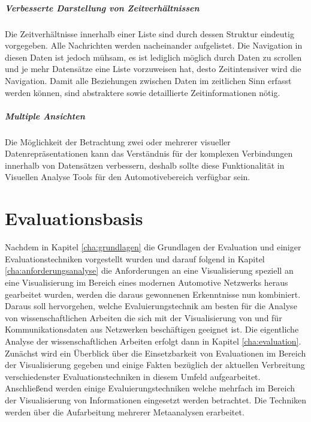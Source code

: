 \documentclass[draft=false
              ,paper=a4
              ,twoside=false
              ,fontsize=11pt
              ,headsepline
              ,BCOR10mm
              ,DIV11
              ]{scrbook}
\begin{document}
\paragraph{Verbesserte Darstellung von Zeitverhältnissen} %
\label{par:verbesserte_darstellung_von_zeitverhältnissen}
Die Zeitverhältnisse innerhalb einer Liste sind durch dessen Struktur eindeutig vorgegeben. Alle Nachrichten werden nacheinander aufgelistet. Die Navigation in diesen Daten ist jedoch mühsam, es ist lediglich möglich durch Daten zu scrollen und je mehr Datensätze eine Liste vorzuweisen hat, desto Zeitintensiver wird die Navigation. Damit alle Beziehungen zwischen Daten im zeitlichen Sinn erfasst werden können, sind abstraktere sowie detaillierte Zeitinformationen nötig.
\paragraph{Multiple Ansichten} %
\label{par:multiple_ansichten}
Die Möglichkeit der Betrachtung zwei oder mehrerer visueller Datenrepräsentationen kann das Verständnis für der komplexen Verbindungen innerhalb von Datensätzen verbessern, deshalb sollte diese Funktionalität in Visuellen Analyse Tools für den Automotivebereich verfügbar sein.

\chapter{Evaluationsbasis} %
\label{cha:evaluationsbasis}
Nachdem in Kapitel \ref{cha:grundlagen} die Grundlagen der Evaluation und einiger Evaluationstechniken vorgestellt wurden und darauf folgend in Kapitel \ref{cha:anforderungsanalyse} die Anforderungen an eine Visualisierung speziell an eine Visualisierung im Bereich eines modernen Automotive Netzwerks heraus gearbeitet wurden, werden die daraus gewonnenen Erkenntnisse nun kombiniert. Daraus soll hervorgehen, welche Evaluierungstechnik am besten für die Analyse von wissenschaftlichen Arbeiten die sich mit der Visualisierung von und für Kommunikationsdaten aus Netzwerken beschäftigen geeignet ist. Die eigentliche Analyse der wissenschaftlichen Arbeiten erfolgt dann in Kapitel \ref{cha:evaluation}. Zunächst wird ein Überblick über die Einsetzbarkeit von Evaluationen im Bereich der Visualisierung gegeben und einige Fakten bezüglich der aktuellen Verbreitung verschiedenster Evaluationstechniken in diesem Umfeld aufgearbeitet. Anschließend werden einige Evaluierungstechniken welche mehrfach im Bereich der Visualisierung von Informationen eingesetzt werden betrachtet. Die Techniken werden über die Aufarbeitung mehrerer Metaanalysen erarbeitet.
\end{document}
